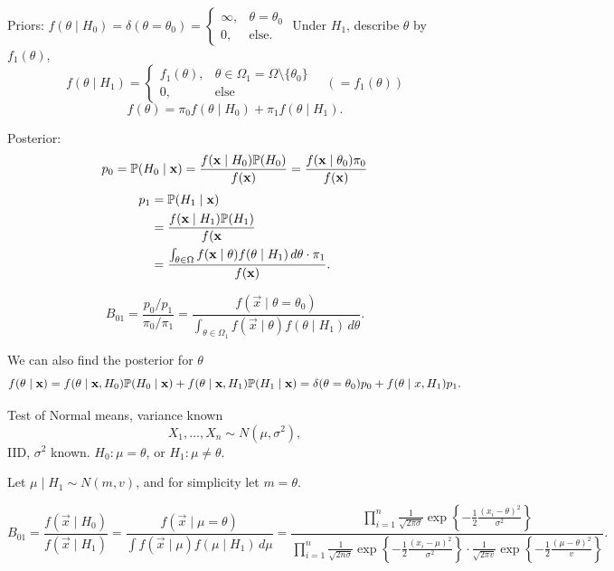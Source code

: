 \documentclass[10pt, a4paper]{article}
\begin{document}
Priors:
$f(\theta \mid H_0) = \delta(\theta = \theta_0) = \begin{cases}
    \infty, &\theta = \theta_0 \\
    0, &\text{else}.
\end{cases}$
Under $H_1$,
describe $\theta$ by $f_1(\theta)$,
\[
f(\theta \mid H_1) = \begin{cases}
    f_1(\theta), &\theta \in \Omega_1 = \Omega \setminus\{\theta_0\} \\
    0, &\text{else}
\end{cases}\quad(= f_1(\theta))
\]
\[
f(\theta) = \pi_0f(\theta \mid H_0) + \pi_1f(\theta \mid H_1).
\]

Posterior:
\[
p_0 = \P(H_0 \mid \vec{x}) = \frac{f(\vec{x}\mid H_0)\P(H_0)}{f(\vec{x})} = \frac{f(\vec{x} \mid \theta_0)\pi_0}{f(\vec{x})}
\]
\begin{align*}
    p_1 &= \P(H_1 \mid \vec{x}) \\
    &= \frac{f(\vec{x}\mid H_1)\P(H_1)}{f(\vec{x}} \\
    &= \frac{\int_{\theta \in \Omega}f(\vec{x} \mid \theta)f(\theta \mid H_1)\,d\theta \cdot \pi_1}{f(\vec{x})}.
\end{align*}

\begin{proposition}
    \[
    B_{01} = \frac{p_0 / p_1}{\pi_0 / \pi_1} = \frac{f(\vec{x} \mid \theta = \theta_0)}{\int_{\theta \in \Omega_1}f(\vec{x} \mid \theta)f(\theta \mid H_1)\,d\theta}.
    \]
\end{proposition}

We can also find the posterior for $\theta$
\[
f(\theta \mid \vec{x}) = f(\theta \mid \vec{x}, H_0)\P(H_0 \mid \vec{x}) + f(\theta \mid \vec{x}, H_1)\P(H_1 \mid \vec{x}) = \delta(\theta = \theta_0)p_0 + f(\theta \mid x, H_1)p_1.
\]

\begin{example}
    Test of Normal means,
    variance known
    \[
    X_1, \dotsc, X_n \sim N(\mu, \sigma ^ 2),
    \]
    IID,
    $\sigma ^ 2$ known.
    $H_0 : \mu = \theta$,
    or $H_1 : \mu \neq \theta$.

    Let $\mu \mid H_1 \sim N(m, v)$,
    and for simplicity let $m = \theta$.

    \[
    B_{01} = \frac{f(\vec{x} \mid H_0)}{f(\vec{x} \mid H_1)} = \frac{f(\vec{x} \mid \mu = \theta)}{\int f(\vec{x} \mid \mu)f(\mu \mid H_1)\,d\mu} = \frac{\prod_{i = 1}^{n}\frac{1}{\sqrt{2\pi\sigma}}\exp\left\{-\frac{1}{2}\frac{(x_i - \theta) ^ 2}{\sigma ^ 2}\right\}}{\prod_{i = 1}^{n}\frac{1}{\sqrt{2n\sigma}}\exp\left\{-\frac{1}{2}\frac{(x_i - \mu) ^ 2}{\sigma ^ 2}\right\}\cdot \frac{1}{\sqrt{2\pi v}}\exp\left\{-\frac{1}{2}\frac{(\mu - \theta) ^ 2}{v}\right\}}.
    \]
\end{example}
\end{document}
